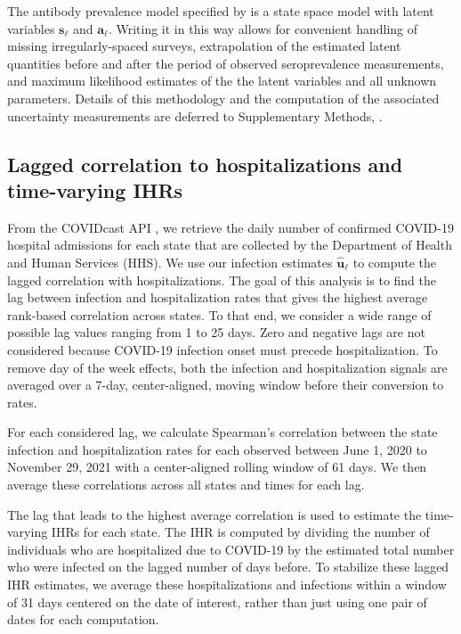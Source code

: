     
The antibody prevalence model specified by
 is a state space model with
latent variables $\mathbf{s}_{\ell}$ and $\mathbf{a}_{\ell}$. Writing it in this
way allows for convenient handling of missing irregularly-spaced surveys,
extrapolation of the estimated latent quantities before and after the period of
observed seroprevalence measurements, and maximum likelihood estimates of the
the latent variables and all unknown parameters. Details of this methodology and
the computation of the associated uncertainty measurements are deferred to
Supplementary Methods, .



\subsection{Lagged correlation to hospitalizations and time-varying IHRs} 
\label{sec:ihr-calculations}

From the COVIDcast API \citep{reinhart2021open}, we retrieve the daily number of
confirmed COVID-19 hospital admissions for each state that are collected by the
\US Department of Health and Human Services (HHS). We use our infection
estimates $\mathbf{\widehat{u}}_\ell$ to compute the lagged correlation with 
hospitalizations. The goal of this analysis is to find the lag between
infection and hospitalization rates that gives the highest average rank-based
correlation across \US states. To that end, we consider a wide range of possible
lag values ranging from 1 to 25 days. Zero and negative lags are not considered
because COVID-19 infection onset must precede hospitalization.
To remove day of the week effects, both the infection and hospitalization
signals are averaged over a 7-day, center-aligned, moving window before their
conversion to rates.

For each considered lag, we calculate Spearman's correlation between the state
infection and hospitalization rates for each observed between June 1, 2020 to
November 29, 2021 with a center-aligned rolling window of 61 days. We then
average these correlations across all states and times for each lag. 

The lag that leads to the highest average correlation is used to estimate the
time-varying IHRs for each state. The IHR is computed by dividing the number of
individuals who are hospitalized due to COVID-19 by the estimated total number
who were infected on the lagged number of days before. To stabilize these lagged
IHR estimates, we average these hospitalizations and infections within a window
of 31 days centered on the date of interest, rather than just using one pair of
dates for each computation.
